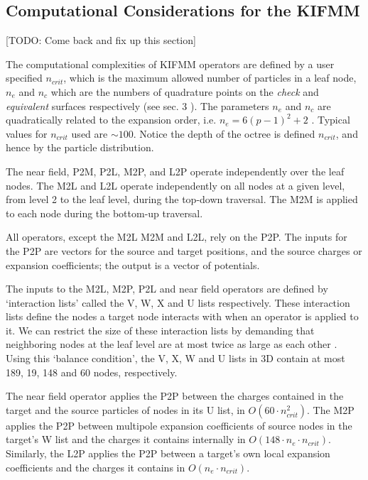 \subsection*{Computational Considerations for the KIFMM}

[TODO: Come back and fix up this section]

The computational complexities of KIFMM operators are defined by a user specified $n_{crit}$, which is the maximum allowed number of particles in a leaf node, $n_e$ and $n_c$ which are the numbers of quadrature points on the \textit{check} and \textit{equivalent} surfaces respectively (see sec. 3 \cite{Ying2004}). The parameters $n_e$ and $n_c$ are quadratically related to the expansion order, i.e. $n_e = 6(p-1)^2 + 2$ \cite{Ying:2004:JCP}. Typical values for $n_{crit}$ used are $\sim 100$. Notice the depth of the octree is defined $n_{crit}$, and hence by the particle distribution.

The near field, P2M, P2L, M2P, and L2P operate independently over the leaf nodes. The M2L and L2L operate independently on all nodes at a given level, from level 2 to the leaf level, during the top-down traversal. The M2M is applied to each node during the bottom-up traversal.

All operators, except the M2L M2M and L2L, rely on the P2P. The inputs for the P2P are vectors for the source and target positions, and the source charges or expansion coefficients; the output is a vector of potentials.

The inputs to the M2L, M2P, P2L and near field operators are defined by `interaction lists' called the V, W, X and U lists respectively. These interaction lists define the nodes a target node interacts with when an operator is applied to it. We can restrict the size of these interaction lists by demanding that neighboring nodes at the leaf level are at most twice as large as each other \cite{sundar2008bottom}. Using this `balance condition', the V, X, W and U lists in 3D contain at most 189, 19, 148 and 60 nodes, respectively.

The near field operator applies the P2P between the charges contained in the target and the source particles of nodes in its U list, in $O(60 \cdot n_{crit}^2)$. The M2P applies the P2P between multipole expansion coefficients of source nodes in the target's W list and the charges it contains internally in $O(148 \cdot n_e \cdot n_{crit})$. Similarly, the L2P applies the P2P between a target's own local expansion coefficients and the charges it contains in $O(n_e \cdot n_{crit})$.

